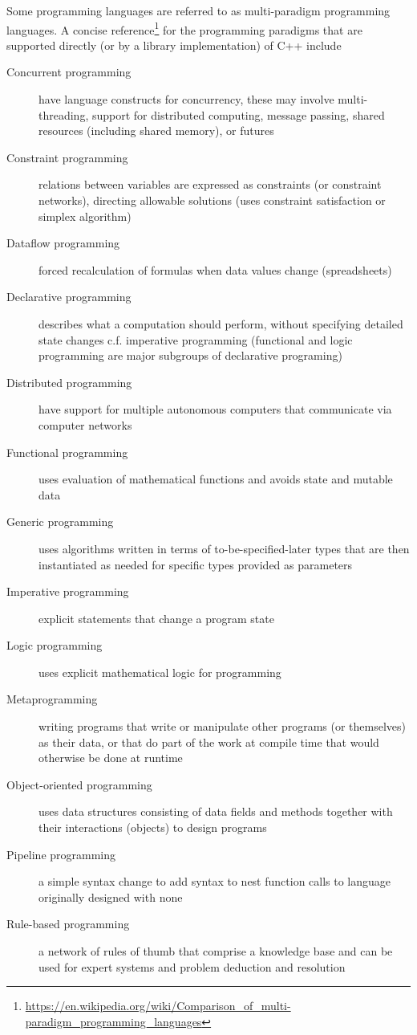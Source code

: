 Some programming languages are referred to as multi-paradigm programming languages. A concise reference\footnote{\url{https://en.wikipedia.org/wiki/Comparison_of_multi-paradigm_programming_languages}} for the programming
paradigms that are supported directly (or by a library implementation) of C++ include
\begin{description}
  \item[Concurrent programming] have language constructs for concurrency, these may involve multi-threading, support for distributed computing, message passing, shared resources (including shared memory), or futures
  \item[Constraint programming] relations between variables are expressed as constraints (or constraint networks), directing allowable solutions (uses constraint satisfaction or simplex algorithm)
  \item[Dataflow programming] forced recalculation of formulas when data values change (\eg spreadsheets)
  \item[Declarative programming] describes what a computation should perform, without specifying detailed state changes c.f. imperative programming (functional and logic programming are major subgroups of declarative programing)
  \item[Distributed programming] have support for multiple autonomous computers that communicate via computer networks
  \item[Functional programming] uses evaluation of mathematical functions and avoids state and mutable data
  \item[Generic programming] uses algorithms written in terms of to-be-specified-later types that are then instantiated as needed for specific types provided as parameters
  \item[Imperative programming] explicit statements that change a program state
  \item[Logic programming] uses explicit mathematical logic for programming
  \item[Metaprogramming] writing programs that write or manipulate other programs (or themselves) as their data, or that do part of the work at compile time that would otherwise be done at runtime
  \item[Object-oriented programming] uses data structures consisting of data fields and methods together with their interactions (objects) to design programs
  \item[Pipeline programming] a simple syntax change to add syntax to nest function calls to language originally designed with none
  \item[Rule-based programming] a network of rules of thumb that comprise a knowledge base and can be used for expert systems and problem deduction and resolution
\end{description}


